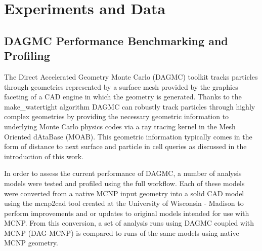 \documentclass[12pt, a4paper]{article}
\begin{document}

\newpage

\section{Experiments and Data}%
\label{experiments_and_data}

\subsection{DAGMC Performance Benchmarking and Profiling}%
\label{perf_benchmark}

The Direct Accelerated Geometry Monte Carlo (DAGMC) toolkit tracks particles through geometries represented by a surface mesh provided by the graphics faceting of a CAD engine in which the geometry is generated\cite{dagmc_2009}. Thanks to the make\_watertight algorithm\cite{make_watertight_smith_2010} DAGMC can robustly track particles through highly complex geometries by providing the necessary geometric information to underlying Monte Carlo physics codes via a ray tracing kernel in the Mesh Oriented dAtaBase (MOAB)\cite{moab}. This geometric information typically comes in the form of distance to next surface and particle in cell queries as discussed in the introduction of this work.

In order to assess the current performance of DAGMC, a number of analysis models were tested and profiled using the full workflow. Each of these models were converted from a native MCNP input geometry into a solid CAD model using the mcnp2cad tool created at the University of Wisconsin - Madison to perform improvements and or updates to original models intended for use with MCNP. From this conversion, a set of analysis runs using DAGMC coupled with MCNP (DAG-MCNP) is compared to runs of the same models using native MCNP geometry.
\end{document}
